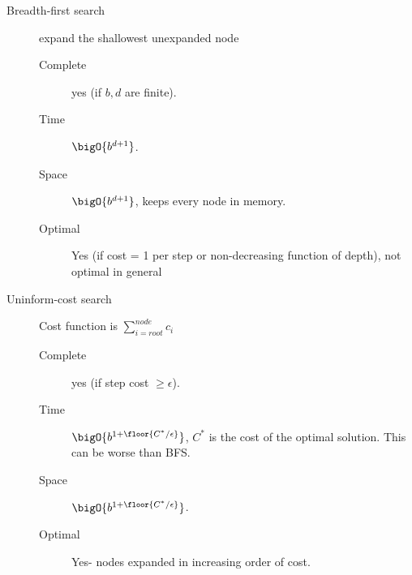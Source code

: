 \begin{description}
    \item [Breadth-first search] expand the shallowest unexpanded node
              \begin{description}
                  \item[Complete] yes (if \(b,d\) are finite).
                  \item[Time] \(\bigO{b^{d+1}}\).
                  \item[Space] \(\bigO{b^{d+1}}\), keeps every node in memory.
                  \item[Optimal] Yes (if cost = 1 per step or non-decreasing function of depth), not optimal in general
              \end{description}
    \item [Uninform-cost search] Cost function is \(\sum_{i = root}^{node} c_i\)
              \begin{description}
                  \item[Complete] yes (if step cost \(\geq \epsilon\)).
                  \item[Time] \(\bigO{b^{1 + \floor{C^\ast / \epsilon}}}\), \(C^\ast\) is the cost of the optimal solution. This can be worse than BFS.
                  \item[Space] \(\bigO{b^{1 + \floor{C^\ast / \epsilon}}}\).
                  \item[Optimal] Yes- nodes expanded in increasing order of cost.
              \end{description}


\end{description}
